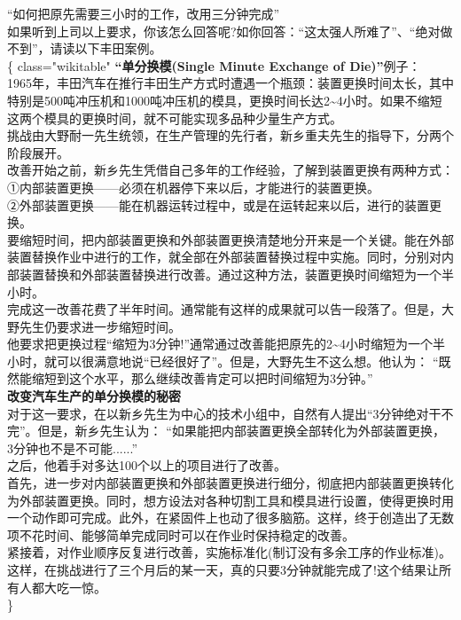 ``如何把原先需要三小时的工作，改用三分钟完成''\\
如果听到上司以上要求，你该怎么回答呢?如你回答：``这太强人所难了''、``绝对做不到''，请读以下丰田案例。\\
\{\textbar{} class="wikitable" \textbar{}\textbf{``单分换模(Single
Minute Exchange of Die)''}例子：\\
1965年，丰田汽车在推行丰田生产方式时遭遇一个瓶颈：装置更换时间太长，其中特别是500吨冲压机和1000吨冲压机的模具，更换时间长达2\textasciitilde{}4小时。如果不缩短这两个模具的更换时间，就不可能实现多品种少量生产方式。\\
挑战由大野耐一先生统领，在生产管理的先行者，新乡重夫先生的指导下，分两个阶段展开。\\
改善开始之前，新乡先生凭借自己多年的工作经验，了解到装置更换有两种方式：\\
①内部装置更换------必须在机器停下来以后，才能进行的装置更换。\\
②外部装置更换------能在机器运转过程中，或是在运转起来以后，进行的装置更换。\\
要缩短时间，把内部装置更换和外部装置更换清楚地分开来是一个关键。能在外部装置替换作业中进行的工作，就全部在外部装置替换过程中实施。同时，分别对内部装置替换和外部装置替换进行改善。通过这种方法，装置更换时间缩短为一个半小时。\\
完成这一改善花费了半年时间。通常能有这样的成果就可以告一段落了。但是，大野先生仍要求进一步缩短时间。\\
他要求把更换过程``缩短为3分钟!''通常通过改善能把原先的2\textasciitilde{}4小时缩短为一个半小时，就可以很满意地说``已经很好了''。但是，大野先生不这么想。他认为：
``既然能缩短到这个水平，那么继续改善肯定可以把时间缩短为3分钟。''\\
\textbf{改变汽车生产的单分换模的秘密}\\
对于这一要求，在以新乡先生为中心的技术小组中，自然有人提出``3分钟绝对干不完''。但是，新乡先生认为：
``如果能把内部装置更换全部转化为外部装置更换，
3分钟也不是不可能......''\\
之后，他着手对多达100个以上的项目进行了改善。\\
首先，进一步对内部装置更换和外部装置更换进行细分，彻底把内部装置更换转化为外部装置更换。同时，想方设法对各种切割工具和模具进行设置，使得更换时用一个动作即可完成。此外，在紧固件上也动了很多脑筋。这样，终于创造出了无数项不花时间、能够简单完成同时可以在作业时保持稳定的改善。\\
紧接着，对作业顺序反复进行改善，实施标准化(制订没有多余工序的作业标准)。这样，在挑战进行了三个月后的某一天，真的只要3分钟就能完成了!这个结果让所有人都大吃一惊。\\
\textbar{}\}

